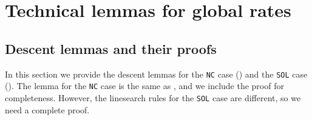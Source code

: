 \section{Technical lemmas for global rates} \label{sec:appendix/global-rate-technical-lemmas}

\subsection{Descent lemmas and their proofs} \label{sec:proof-descent-lemma}

In this section we provide the descent lemmas for the \texttt{NC} case () and the \texttt{SOL} case ().
The lemma for the \texttt{NC} case is the same as \citet[Lemma 6.3]{he2023newton}, and we include the proof for completeness.
However, %
the linesearch rules for the \texttt{SOL} case are different, so we need a complete proof.


